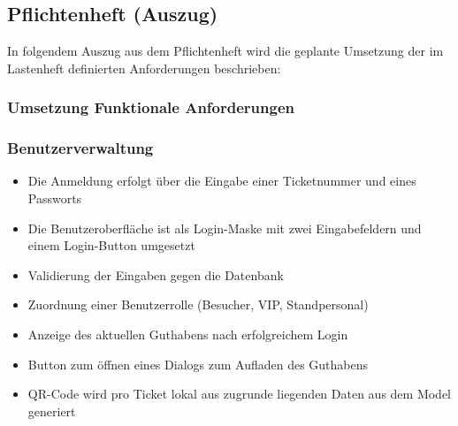 \subsection{Pflichtenheft (Auszug)}
\label{app:Pflichtenheft}
In folgendem Auszug aus dem Pflichtenheft wird die geplante Umsetzung der im Lastenheft definierten
Anforderungen beschrieben:

\subsubsection{Umsetzung Funktionale Anforderungen}
\label{sec:UmsetzungFunktionaleAnforderungen}

\subsubsection*{Benutzerverwaltung}
\begin{itemize}
    \item Die Anmeldung erfolgt über die Eingabe einer Ticketnummer und eines Passworts 
    \item Die Benutzeroberfläche ist als Login-Maske mit zwei Eingabefeldern und einem Login-Button umgesetzt
    \item Validierung der Eingaben gegen die Datenbank
    \item Zuordnung einer Benutzerrolle (Besucher, \acs{VIP}, Standpersonal)
    \item Anzeige des aktuellen Guthabens nach erfolgreichem Login
    \item Button zum öffnen eines Dialogs zum Aufladen des Guthabens
    \item \acs{QR}-Code wird pro Ticket lokal aus zugrunde liegenden Daten aus dem Model generiert
\end{itemize}


